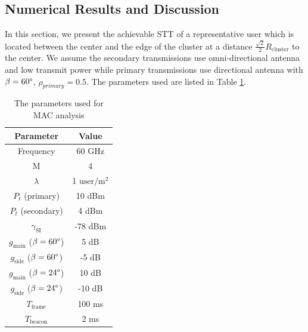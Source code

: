 \documentclass[10pt, conference, letterpaper]{IEEEtran}
\DeclareMathOperator*{\SI}{\mathrm{SI}}
\begin{document}




\subsection{Numerical Results and Discussion}
In this section, we present the achievable STT of a representative user which is located between the center and the edge of the cluster at a distance $\frac{\sqrt{2}}{2}R_{\mathrm{cluster}}$ to the center.
We assume the secondary transmissions use omni-directional antenna and low transmit power while primary transmissions use directional antenna with $\beta=60\degree$, $\rho_{primary} = 0.5$.
The parameters used are listed in Table \ref{tab:clusteranalysis:parameter}.

\begin{table}
	\centering
	\caption{The parameters used for MAC analysis}
	\begin{tabular}{cc}
		\hline
		Parameter & Value \\
		\hline
		Frequency & 60 GHz \\
		M & 4 \\
		$\lambda$ & 1 $\mathrm{user/m^2}$ \\
		$P_t$ (primary) & 10 dBm \\
		$P_t$ (secondary) & 4 dBm \\
		$\gamma_{\SI}$ & -78 dBm \\
		$g_{\mathrm{main}}$ ($\beta = 60\degree$) & 5 dB \\
		$g_{\mathrm{side}}$ ($\beta = 60\degree$) & -5 dB \\
		$g_{\mathrm{main}}$ ($\beta = 24\degree$) & 10 dB \\
		$g_{\mathrm{side}}$ ($\beta = 24\degree$) & -10 dB \\		
		$T_{\mathrm{frame}}$ & 100 ms \\
		$T_{\mathrm{beacon}}$ & 2 ms \\
		\hline
	\end{tabular}
	\label{tab:clusteranalysis:parameter}	
\end{table}
\end{document}
